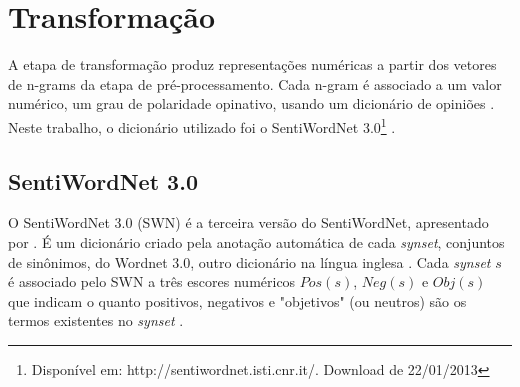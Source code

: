 \section{Transformação}


A etapa de transformação produz representações numéricas a partir dos vetores de n-grams da etapa de pré-processamento. Cada n-gram é associado a um valor numérico, um grau de polaridade opinativo, usando um dicionário de opiniões \cite{ballhysa2012fuzzy, moraes2012document, mouthami2013sentiment}. Neste trabalho, o dicionário utilizado foi o SentiWordNet 3.0\footnote{Disponível em: http://sentiwordnet.isti.cnr.it/. Download de 22/01/2013} \cite{baccianella2010sentiwordnet}.

\subsection{SentiWordNet 3.0}

O SentiWordNet 3.0 (SWN) é a terceira versão do SentiWordNet, apresentado por \cite{esuli2006sentiwordnet}. É um dicionário criado pela anotação automática de cada \textit{synset}, conjuntos de sinônimos, do Wordnet 3.0, outro dicionário na língua inglesa \cite{fellbaum2005wordnet}. Cada \textit{synset} $s$ é associado pelo SWN a três  escores numéricos $Pos(s)$, $Neg(s)$ e $Obj(s)$ que indicam o quanto positivos, negativos e "objetivos" (ou neutros) são os termos existentes no \textit{synset} \cite{baccianella2010sentiwordnet}. 


